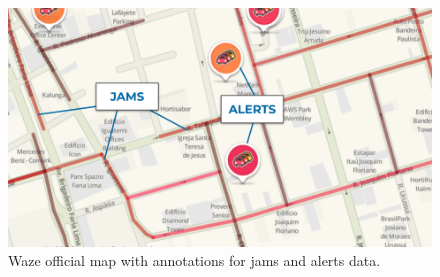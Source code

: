\begin{figure}[t]
    \centering
    \includegraphics[width=\textwidth]{figures/3-dados-metodologia/from-map-to-data.png}
    \caption{Waze official map with annotations for jams and alerts data. }
    \label{fig:3-waze-map-to-data}
\end{figure}

